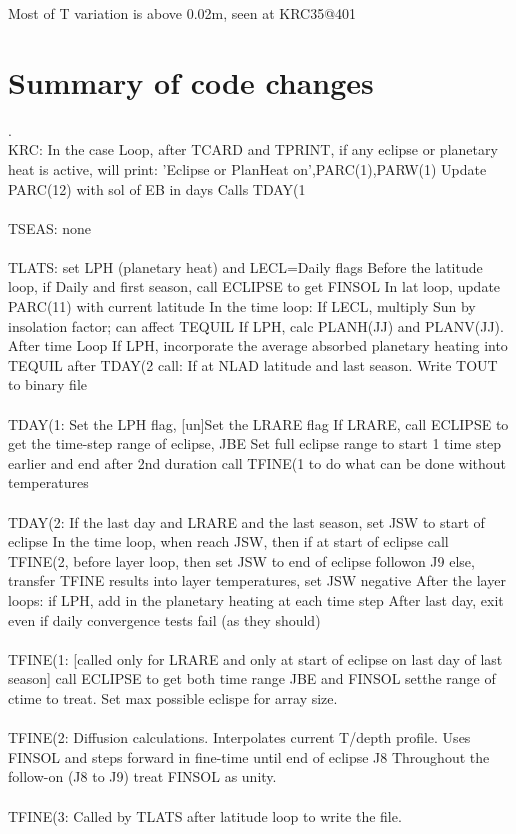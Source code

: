 \documentclass{article}
\begin{document}
Most of T variation is above 0.02m, seen at KRC35@401

\clearpage

\section{Summary of code changes}

. \\
KRC:
\qi  In the case Loop, after TCARD and TPRINT, if any eclipse or planetary heat 
  is active, will print:  'Eclipse or PlanHeat on',PARC(1),PARW(1)
\qi Update PARC(12) with sol of EB in days
\qi   Calls TDAY(1
\\ \\
TSEAS:  none
\\ \\
TLATS:
\qi   [un]set LPH (planetary heat) and LECL=Daily flags
\qi   Before the latitude loop, if Daily and first season, call ECLIPSE to get FINSOL
\qi   In lat loop, update PARC(11) with current latitude
\qi   In the time loop:
\qii      If LECL,  multiply Sun by insolation factor; can affect TEQUIL
\qii      If LPH, calc PLANH(JJ) and PLANV(JJ).
\qi   After time Loop
\qii      If LPH, incorporate the average absorbed planetary heating into TEQUIL
\qi after TDAY(2 call: If at NLAD latitude and last season. Write TOUT to binary file
\\ \\
TDAY(1:
\qi    [un]Set the LPH flag, [un]Set the LRARE flag
\qi    If LRARE, 
\qii    call ECLIPSE to get the time-step range of eclipse, JBE
\qii    Set full eclipse range to start 1 time step earlier and end after 2nd duration
\qii    call TFINE(1 to do what can be done without temperatures
\\ \\
TDAY(2:
 \qi  If the last day and LRARE and the last season, set JSW to start of eclipse
 \qi  In the time loop, when reach JSW, then 
 \qii  if at start of eclipse call TFINE(2, before layer loop, then set JSW to end of eclipse followon J9
    else, transfer TFINE results into layer temperatures, set JSW negative
\qi After the layer loops: if LPH, add in the planetary heating at each time step
\qi After last day, exit even if daily convergence tests fail (as they should) 
\\ \\
TFINE(1: [called only for LRARE and only at start of eclipse on last day of last season] 
\qi  call ECLIPSE to get both time range JBE and FINSOL
\qi  setthe range of ctime to treat. Set max possible eclispe for array size.
\\ \\
TFINE(2:  Diffusion calculations.   
\qi  Interpolates current T/depth profile.
\qi Uses FINSOL and steps forward in fine-time until end of eclipse J8
\qi  Throughout the follow-on (J8 to J9) treat FINSOL as unity. 
\\ \\
TFINE(3:  Called by TLATS after latitude loop to write the  file. 
\end{document}
